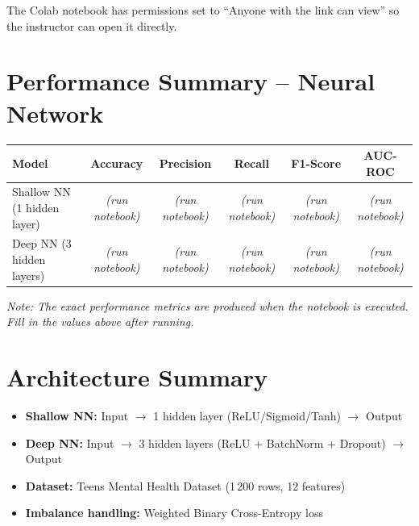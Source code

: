 \documentclass[11pt]{article}
\begin{document}
\noindent The Colab notebook has permissions set to ``Anyone with the link can view''
so the instructor can open it directly.

\section*{Performance Summary -- Neural Network}

\begin{center}
\begin{tabular}{lccccc}
\toprule
\textbf{Model} & \textbf{Accuracy} & \textbf{Precision} & \textbf{Recall} & \textbf{F1-Score} & \textbf{AUC-ROC} \\
\midrule
Shallow NN (1 hidden layer) & \emph{(run notebook)} & \emph{(run notebook)} & \emph{(run notebook)} & \emph{(run notebook)} & \emph{(run notebook)} \\
Deep NN (3 hidden layers)   & \emph{(run notebook)} & \emph{(run notebook)} & \emph{(run notebook)} & \emph{(run notebook)} & \emph{(run notebook)} \\
\bottomrule
\end{tabular}
\end{center}

\noindent \emph{Note: The exact performance metrics are produced when the notebook is
executed. Fill in the values above after running.}

\section*{Architecture Summary}

\begin{itemize}[leftmargin=*]
    \item \textbf{Shallow NN:} Input $\rightarrow$ 1 hidden layer (ReLU/Sigmoid/Tanh) $\rightarrow$ Output
    \item \textbf{Deep NN:} Input $\rightarrow$ 3 hidden layers (ReLU + BatchNorm + Dropout) $\rightarrow$ Output
    \item \textbf{Dataset:} Teens Mental Health Dataset (1\,200 rows, 12 features)
    \item \textbf{Imbalance handling:} Weighted Binary Cross-Entropy loss
\end{itemize}

\vfill

\end{document}
